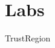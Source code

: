 \documentclass[nociteref]{SIAM-GH-book}
\begin{document}
\part{Labs}
%
%
%
%
%
%
%
%
%
%
%
%
%
{TrustRegion}
%
%
%
%
%
\end{document}
